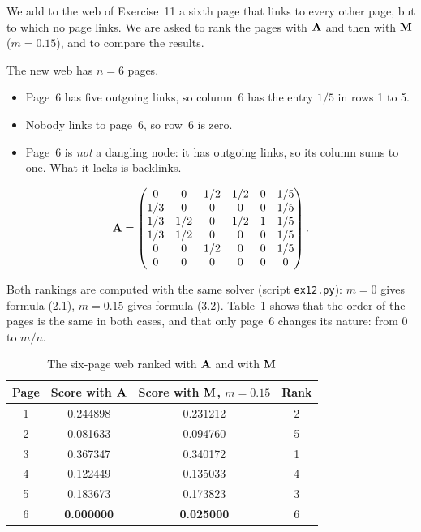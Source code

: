 

We add to the web of Exercise~11 a sixth page that links to every other page, but to which no page links.
We are asked to rank the pages with $\mathbf{A}$ and then with $\mathbf{M}$ ($m = 0.15$), and to compare the results.


The new web has $n = 6$ pages.
\begin{itemize}
  \item Page~6 has five outgoing links, so column~6 has the entry $1/5$ in rows 1 to 5.
  \item Nobody links to page~6, so row~6 is zero.
  \item Page~6 is \emph{not} a dangling node: it has outgoing links, so its column sums to one. What it lacks is backlinks.
\end{itemize}
\[
  \mathbf{A} = \begin{pmatrix}
    0 & 0 & 1/2 & 1/2 & 0 & 1/5\\
    1/3 & 0 & 0 & 0 & 0 & 1/5\\
    1/3 & 1/2 & 0 & 1/2 & 1 & 1/5\\
    1/3 & 1/2 & 0 & 0 & 0 & 1/5\\
    0 & 0 & 1/2 & 0 & 0 & 1/5\\
    0 & 0 & 0 & 0 & 0 & 0
  \end{pmatrix}.
\]


Both rankings are computed with the same solver (script \texttt{ex12.py}): $m = 0$ gives formula (2.1), $m = 0.15$ gives formula (3.2).
Table~\ref{tab:ex12} shows that the order of the pages is the same in both cases, and that only page~6 changes its nature: from $0$ to $m/n$.

\begin{table}[H]\centering
\begin{tabular}{cccc}
\toprule
\textbf{Page} & \textbf{Score with $\mathbf{A}$} & \textbf{Score with $\mathbf{M}$, $m=0.15$} & \textbf{Rank} \\
\midrule
1 & 0.244898 & 0.231212 & 2 \\
2 & 0.081633 & 0.094760 & 5 \\
3 & 0.367347 & 0.340172 & 1 \\
4 & 0.122449 & 0.135033 & 4 \\
5 & 0.183673 & 0.173823 & 3 \\
6 & \textbf{0.000000} & \textbf{0.025000} & 6 \\
\bottomrule
\end{tabular}
\caption{The six-page web ranked with $\mathbf{A}$ and with $\mathbf{M}$}
\label{tab:ex12}
\end{table}


